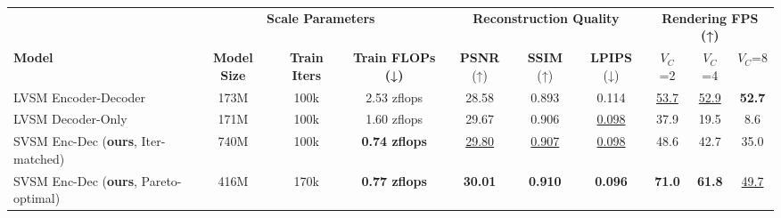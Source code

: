 \begin{table}[t]
  \centering
  \begin{threeparttable}
    \scriptsize
    \setlength{\tabcolsep}{3pt} %

    \begin{subtable}{\linewidth}
      \begin{tabular*}{\linewidth}{@{\extracolsep{\fill}} l *{9}{c}}
        \toprule
        
        & \multicolumn{3}{c}{\textbf{Scale Parameters}}
        & \multicolumn{3}{c}{\textbf{Reconstruction Quality}}
        & \multicolumn{3}{c}{\textbf{Rendering FPS (↑)}} \\
        
        \cmidrule(lr){2-4} \cmidrule(lr){5-7} \cmidrule(lr){8-10}
        
        \textbf{Model} 
        & \textbf{Model Size} & \textbf{Train Iters} & \textbf{Train FLOPs (↓)}  
        & \textbf{PSNR} (↑) & \textbf{SSIM} (↑) & \textbf{LPIPS} (↓)
        & $V_C$=2  & $V_C$=4  & $V_C$=8  \\
        
        \midrule
        
        LVSM Encoder-Decoder~\citep{jin2024lvsm}
        & 173M & 100k & 2.53 zflops 
        & 28.58 & 0.893 & 0.114
        & \underline{53.7} & \underline{52.9} & \textbf{52.7} \\
        
        LVSM Decoder-Only~\citep{jin2024lvsm}
        & 171M & 100k & 1.60 zflops 
        & 29.67 & 0.906 & \underline{0.098}
        & 37.9 & 19.5 & 8.6 \\
        
        SVSM Enc-Dec (\textbf{ours}, Iter-matched)
        & 740M & 100k & \textbf{0.74 zflops} 
        & \underline{29.80} & \underline{0.907} & \underline{0.098} 
        & 48.6 & 42.7 & 35.0 \\

        SVSM Enc-Dec (\textbf{ours}, Pareto-optimal)
        & 416M & 170k & \textbf{0.77 zflops} 
        & \textbf{30.01} & \textbf{0.910} & \textbf{0.096}
        & \textbf{71.0} & \textbf{61.8} & \underline{49.7} \\
        

\end{tabular*}
\end{subtable}
\end{threeparttable}
\end{table}
